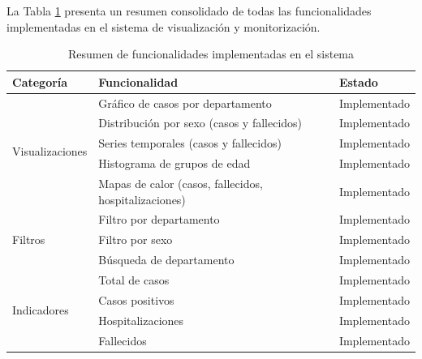 \documentclass[12pt,a4paper]{article}
\begin{document}
La Tabla \ref{tab:resumen-funcionalidades} presenta un resumen consolidado de todas las funcionalidades implementadas en el sistema de visualización y monitorización.

\begin{table}[H]
    \centering
    \caption{Resumen de funcionalidades implementadas en el sistema}
    \label{tab:resumen-funcionalidades}
    \begin{tabular}{@{}lp{7cm}l@{}}
        \toprule
        \textbf{Categoría}               & \textbf{Funcionalidad}                                & \textbf{Estado} \\
        \midrule
        \multirow{5}{*}{Visualizaciones} & Gráfico de casos por departamento                     & Implementado    \\
                                         & Distribución por sexo (casos y fallecidos)            & Implementado    \\
                                         & Series temporales (casos y fallecidos)                & Implementado    \\
                                         & Histograma de grupos de edad                          & Implementado    \\
                                         & Mapas de calor (casos, fallecidos, hospitalizaciones) & Implementado    \\
        \midrule
        \multirow{3}{*}{Filtros}         & Filtro por departamento                               & Implementado    \\
                                         & Filtro por sexo                                       & Implementado    \\
                                         & Búsqueda de departamento                              & Implementado    \\
        \midrule
        \multirow{4}{*}{Indicadores}     & Total de casos                                        & Implementado    \\
                                         & Casos positivos                                       & Implementado    \\
                                         & Hospitalizaciones                                     & Implementado    \\
                                         & Fallecidos                                            & Implementado    \\
        \midrule

\end{tabular}
\end{table}
\end{document}
